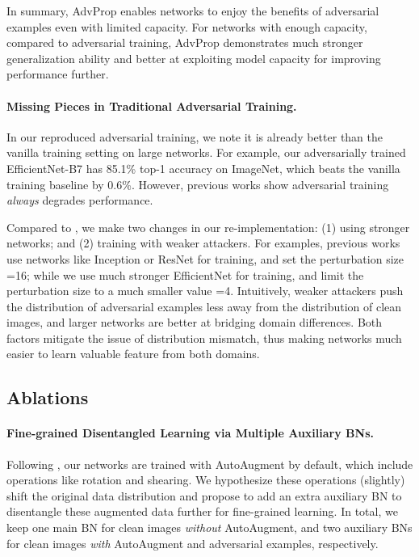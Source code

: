 \documentclass[10pt,twocolumn,letterpaper]{article}
\begin{document}
In summary, AdvProp enables networks to enjoy the benefits of adversarial examples even with limited capacity. For networks with enough capacity, compared to adversarial training, AdvProp demonstrates much stronger generalization ability and better at exploiting model capacity for improving performance further.


\paragraph{Missing Pieces in Traditional Adversarial Training.}
In our reproduced adversarial training,  we note it is already better than the vanilla training setting on large networks. For example, our adversarially trained EfficientNet-B7 has 85.1\% top-1 accuracy on ImageNet, which beats the vanilla training baseline by 0.6\%. However, previous works  \cite{Kurakin2017,Kannan2018} show adversarial training \emph{always} degrades performance.


Compared to \cite{Kurakin2017,Kannan2018}, we make two changes in our re-implementation: (1) using stronger networks; and (2) training with weaker attackers. For examples, previous works use networks like Inception or ResNet for training, and set the perturbation size =16; while we use much stronger EfficientNet for training, and limit the perturbation size to a much smaller value =4. Intuitively, weaker attackers push the distribution of adversarial examples less away from the distribution of clean images, and larger networks are better at bridging domain differences. Both factors mitigate the issue of distribution mismatch, thus making networks much easier to learn valuable feature from both domains.


\subsection{Ablations}
\label{sec:attacker_strength}
\paragraph{Fine-grained Disentangled Learning via Multiple Auxiliary BNs.}
Following \cite{Tan2019}, our networks are trained with AutoAugment \cite{Cubuk2018} by default, which include operations like rotation and shearing. We hypothesize these operations (slightly) shift the original data distribution and propose to add an extra auxiliary BN to disentangle these augmented data further for fine-grained learning. In total, we keep one main BN for clean images \emph{without} AutoAugment, and two auxiliary BNs for clean images \emph{with} AutoAugment and adversarial examples, respectively. 
\end{document}
